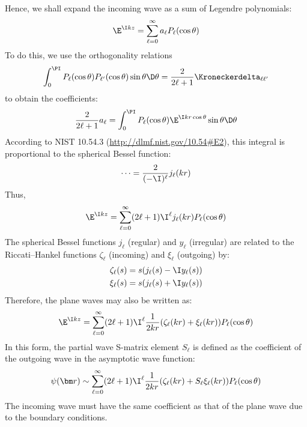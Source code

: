 \documentclass[fleqn, 12pt]{article}
\begin{document}
\begin{enumerate}
  Hence, we shall expand the incoming wave as a sum of Legendre polynomials:
  \begin{align*}
    \E^{\I k z} =
    \sum_{\ell = 0}^\infty a_\ell P_\ell(\cos \theta)
  \end{align*}
  To do this, we use the orthogonality relations
  \begin{align*}
     \int_0^\PI P_\ell(\cos \theta) P_{\ell'}(\cos \theta) \sin \theta \D \theta
    = \frac{2}{2 \ell + 1} \Kroneckerdelta_{\ell \ell'}
  \end{align*}
  to obtain the coefficients:
  \begin{align*}
     \frac{2}{2 \ell + 1} a_\ell
    = \int_0^\PI P_\ell(\cos \theta) \E^{\I k r \cos \theta} \sin \theta \D \theta
  \end{align*}
  According to NIST 10.54.3 (\url{http://dlmf.nist.gov/10.54#E2}), this
  integral is proportional to the spherical Bessel function:
  \begin{align*}
    \dots = \frac{2}{(-\I)^\ell} j_\ell(k r)
  \end{align*}
  Thus,
  \begin{align*}
    \E^{\I k z} =
    \sum_{\ell = 0}^\infty (2 \ell + 1) \I^\ell j_\ell(k r) P_\ell(\cos \theta)
  \end{align*}
  The spherical Bessel functions $j_\ell$ (regular) and $y_\ell$ (irregular)
  are related to the Riccati--Hankel functions $\zeta_\ell$ (incoming) and
  $\xi_\ell$ (outgoing) by:
  \begin{align*}
    &\zeta_\ell(s) = s (j_\ell(s) - \I y_\ell(s)) \\
    &\xi_\ell(s) = s (j_\ell(s) + \I y_\ell(s))
  \end{align*}
  Therefore, the plane waves may also be written as:
  \begin{align*}
    \E^{\I k z} =
    \sum_{\ell = 0}^\infty (2 \ell + 1) \I^\ell
    \frac{1}{2 k r} (\zeta_\ell(k r) + \xi_\ell(k r)) P_\ell(\cos \theta)
  \end{align*}
  In this form, the partial wave S-matrix element $S_\ell$ is defined as the
  coefficient of the outgoing wave in the asymptotic wave function:
  \begin{align*}
    \psi(\bm r) \sim \sum_{\ell = 0}^\infty (2 \ell + 1) \I^\ell
    \frac{1}{2 k r} (\zeta_\ell(k r) + S_\ell \xi_\ell(k r)) P_\ell(\cos \theta)
  \end{align*}
  The incoming wave must have the same coefficient as that of the plane wave
  due to the boundary conditions.


\end{enumerate}
\end{document}
